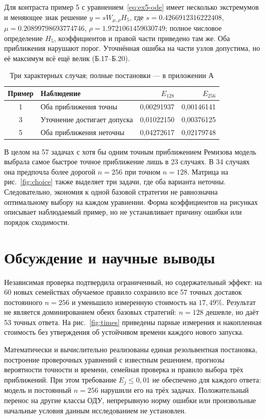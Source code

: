 Для контраста пример 5 с уравнением~\eqref{eq:ex5-ode} имеет несколько экстремумов и меняющее знак решение $y=sW_{\mu,\rho}H_5$, где $s=0.4266912316222408$, $\mu=0.20899798693774746$, $\rho=1.9721061459030749$; полное числовое определение $H_5$, коэффициентов и правой части приведено там же. Оба приближения нарушают порог. Уточнённая ошибка на части узлов допустима, но её максимум всё ещё велик (Б.17--Б.20).
\begin{table}[!ht]\centering\caption{Три характерных случая; полные постановки --- в приложении А}\label{tab:cases}
\begin{tabular}{clrr}\toprule Пример&Наблюдение&$E_{128}$&$E_{256}$\\\midrule
1&Оба приближения точны&0,00291937&0,00146141\\
3&Уточнение достигает допуска&0,01022150&0,00376125\\
5&Оба приближения неточны&0,04272617&0,02179748\\\bottomrule\end{tabular}\end{table}

В целом на 57 задачах с хотя бы одним точным приближением Ремизова модель выбрала самое быстрое точное приближение лишь в 23 случаях. В 34 случаях она предпочла более дорогой $n=256$ при точном $n=128$. Матрица на рис.~\ref{fig:choice} также выделяет три задачи, где оба варианта неточны. Следовательно, экономия к одной базовой стратегии не равнозначна оптимальному выбору на каждом уравнении. Форма коэффициентов на рисунках описывает наблюдаемый пример, но не устанавливает причину ошибки или порядок сходимости.
\clearpage
\section{Обсуждение и научные выводы}
Независимая проверка подтвердила ограниченный, но содержательный эффект: на 60 новых семействах обучаемое правило сохранило все 57 точных доставок постоянного $n=256$ и уменьшило измеренную стоимость на $17{,}49\%$. Результат не является доминированием обеих базовых стратегий: $n=128$ дешевле, но даёт 53 точных ответа. На рис.~\ref{fig:times} приведены парные измерения и накопленная стоимость без утверждения об устойчивом времени каждого нового запуска.

Математически и вычислительно реализованы единая резольвентная постановка, построение проверочных уравнений с известным решением, прогнозы вероятности точности и времени, семейная проверка и правило выбора трёх приближений. При этом требование $E_j\le0{,}01$ не обеспечено для каждого ответа: модель и постоянный $n=256$ нарушили его на трёх задачах. Положительный перенос на другие классы ОДУ, непрерывную норму ошибки или произвольные начальные условия данным исследованием не установлен.

